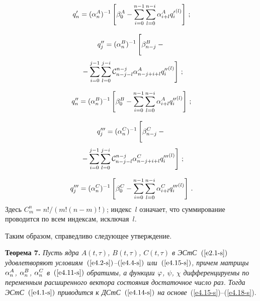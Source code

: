 \begin{multicols}{2}

    \noindent
    \begin{equation}
    q_n' = (\alpha_n^A)^{-1} \left[ \beta_{0}^A -\sum\limits_{i=0}^{n-1} \sum\limits_{l=0}^{n-i}
    \alpha_{i+l}^A {q_i'}^{(l)}\right]\,;
    \end{equation}

     \vspace*{-12pt}

\noindent
\begin{multline}
    q_j'' = (\alp_n^B)^{-1} \left[
        \vphantom{    \sss_{l=0}^{j-i}}
        \beta_{n-j}^B -{}\right.\\[3pt]
\left.    {}-\sss_{i=0}^{j-1}
    \sss_{l=0}^{j-i} {\cal C}_{n-j-l}^{n-j} \alp_{n-j+i+l}^A {q_i''}^{(l)}\right]\,;
    \end{multline}

    \vspace*{-6pt}

    \begin{equation}
    q_n'' = (\alpha_n^B)^{-1} \left[ \beta_{0}^B -\sum\limits_{i=0}^{n-1}
    \sum\limits_{l=0}^{n-i}  \alpha_{i+l}^A {q_i''}^{(l)}\right]\,;
    \end{equation}

    \vspace*{-12pt}

    \noindent
    \begin{multline}
    q_j''' = (\alp_n^C)^{-1} \left[
        \vphantom{    \sss_{l=0}^{j-i}}
         \beta_{n-j}^C -{}\right.\\[3pt]
\left.    {}-\sss_{i=0}^{j-1}
    \sss_{l=0}^{j-i} {\cal C}_{n-j-l}^{n-j} \alp_{n-j+i+l}^C {q_i'''}^{(l)}\right]\,;
    \end{multline}

\noindent
\begin{equation}
    q_j''' = (\alpha_n^C)^{-1} \left[ \beta_{0}^C -\sum\limits_{i=0}^{n-1} \sum\limits_{l=0}^{n-i}
    \alpha_{i+l}^C {q_i'''}^{(l)}\right]\,.
    \label{e4.18-s}
    \end{equation}
Здесь $C_m^n=n!/(m!(n-m)!)$; индекс~$l$ означает, что суммирование
проводится по всем индексам, исключая~$l$.

Таким образом, справедливо следующее утверждение.

\medskip

\noindent
\textbf{Теорема 7.} \textit{Пусть  ядра $A(t,\tau)$, $B(t,\tau)$,
$C(t,\tau)$ в ЭСтС~$(\ref{e2.1-s})$ удовлетворяют
условиям~$(\ref{e4.2-s})$--$(\ref{e4.4-s})$
или~$(\ref{e4.15-s})$, причем матрицы  $\alpha_n^A$, $\alpha_n^B$, $\alpha_n^C$
в~$(\ref{e4.11-s})$ обратимы, а функции  $\varphi$, $\psi$, $\chi$
дифференцируемы по переменным расширенного вектора состояния достаточное число раз.
Тогда ЭСтС~$(\ref{e4.1-s})$ приводится к ДСтС~$(\ref{e4.14-s})$
на основе}~(\ref{e4.15-s})--(\ref{e4.18-s}).


\end{multicols}
